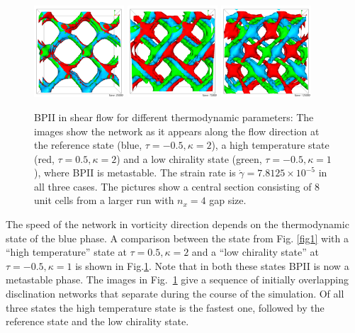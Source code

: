 \documentclass[12pt,twoside]{iopart}
\newcommand{\ex}[1]{\times10^{#1}}
\begin{document}
\begin{figure}[t]
\centering
\includegraphics[width=0.3\textwidth]{disc_bp2_tk_scan_25k.png}
\includegraphics[width=0.3\textwidth]{disc_bp2_tk_scan_75k.png}
\includegraphics[width=0.3\textwidth]{disc_bp2_tk_scan_125k.png}
\caption{BPII in shear flow for different thermodynamic parameters: The images show the network as it appears along the flow direction at the reference state (blue, $\tau=-0.5, \kappa=2$), a high temperature state (red, $\tau=0.5, \kappa=2$) and a low chirality state (green, $\tau=-0.5, \kappa=1$), where BPII is metastable. The strain rate is $\dot{\gamma}=7.8125\ex{-5}$ in all three cases. The pictures show a central section consisting of 8 unit cells from a larger run with $n_x=4$ gap size.}
\label{fig2}
\end{figure}

The speed of the network in vorticity direction depends on the thermodynamic state of the blue phase.
A comparison between the state from Fig. \ref{fig1} with a ``high temperature'' state at $\tau=0.5, \kappa=2$ and a ``low chirality state'' at $\tau=-0.5, \kappa=1$
is shown in Fig.\ref{fig2}. Note that in both these states BPII is now a metastable phase. 
The images in Fig.~\ref{fig2} give a sequence of initially overlapping disclination networks that separate during the course of the simulation.
Of all three states the high temperature state is the fastest one, followed by the reference state and the low chirality state.
\end{document}
